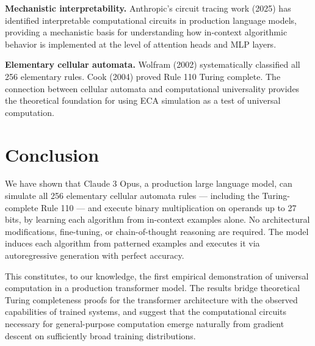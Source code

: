 \documentclass[twocolumn,switch,10pt]{article}
\begin{document}
\textbf{Mechanistic interpretability.} Anthropic's circuit tracing work (2025) has identified interpretable computational circuits in production language models, providing a mechanistic basis for understanding how in-context algorithmic behavior is implemented at the level of attention heads and MLP layers.

\textbf{Elementary cellular automata.} Wolfram (2002) systematically classified all 256 elementary rules. Cook (2004) proved Rule 110 Turing complete. The connection between cellular automata and computational universality provides the theoretical foundation for using ECA simulation as a test of universal computation.

\section{Conclusion}\label{sec:conclusion}

We have shown that Claude 3 Opus, a production large language model, can simulate all 256 elementary cellular automata rules --- including the Turing-complete Rule 110 --- and execute binary multiplication on operands up to 27 bits, by learning each algorithm from in-context examples alone. No architectural modifications, fine-tuning, or chain-of-thought reasoning are required. The model induces each algorithm from patterned examples and executes it via autoregressive generation with perfect accuracy.

This constitutes, to our knowledge, the first empirical demonstration of universal computation in a production transformer model. The results bridge theoretical Turing completeness proofs for the transformer architecture with the observed capabilities of trained systems, and suggest that the computational circuits necessary for general-purpose computation emerge naturally from gradient descent on sufficiently broad training distributions.
\end{document}
